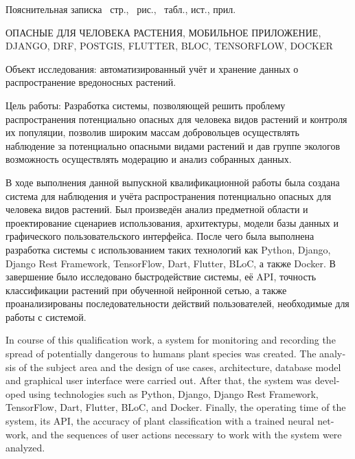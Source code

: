 

\tab
Пояснительная записка \pagescount\ стр., \ рис., \ табл.,  ист.,  прил.

\tab
\MakeUppercase{Опасные для человека растения, Мобильное приложение, Django, DRF, PostGIS, Flutter, BLoC, TensorFlow, Docker}

\tab
Объект исследования: автоматизированный учёт и хранение данных о распространение вредоносных растений.

\tab
Цель работы: Разработка системы, позволяющей решить проблему распространения потенциально опасных для человека видов растений и контроля их популяции, позволив широким массам добровольцев осуществлять наблюдение за потенциально опасными видами растений и дав группе экологов возможность осуществлять модерацию и анализ собранных данных.

\tab
В ходе выполнения данной выпускной квалификационной работы была создана система для наблюдения и учёта распространения потенциально опасных для человека видов растений.
Был произведён анализ предметной области и проектирование сценариев использования, архитектуры, модели базы данных и графического пользовательского интерфейса.
После чего была выполнена разработка системы с использованием таких технологий как Python, Django, Django Rest Framework, TensorFlow, Dart, Flutter, BLoC, а также Docker.
В завершение было исследовано быстродействие системы, её API, точность классификации растений при обученной нейронной сетью, а также проанализированы последовательности действий пользователей, необходимые для работы с системой.

\cleardoublepage
{}

\tab
\begin{otherlanguage}{english}
	In course of this qualification work, a system for monitoring and recording the spread of potentially dangerous to humans plant species was created.
	The analysis of the subject area and the design of use cases, architecture, database model and graphical user interface were carried out.
	After that, the system was developed using technologies such as Python, Django, Django Rest Framework, TensorFlow, Dart, Flutter, BLoC, and Docker.
	Finally, the operating time of the system, its API, the accuracy of plant classification with a trained neural network, and the sequences of user actions necessary to work with the system were analyzed.
\end{otherlanguage}
